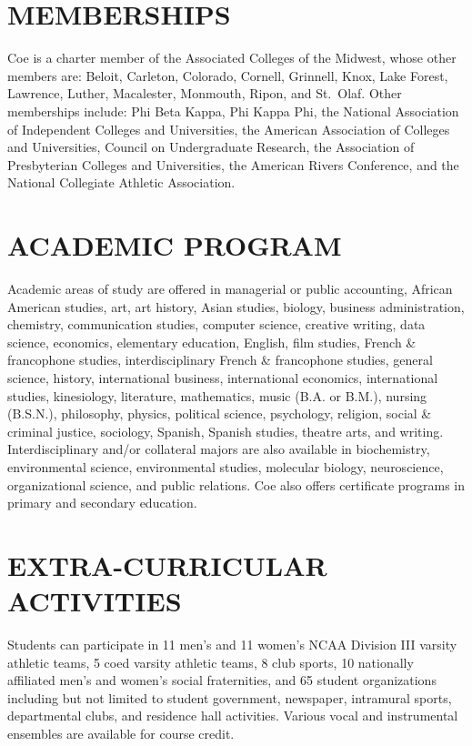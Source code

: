 \documentclass[
  letterpaper,
]{scrbook}
\begin{document}
\section{MEMBERSHIPS}\label{memberships}

Coe is a charter member of the Associated Colleges of the Midwest, whose
other members are: Beloit, Carleton, Colorado, Cornell, Grinnell, Knox,
Lake Forest, Lawrence, Luther, Macalester, Monmouth, Ripon, and
St.~Olaf. Other memberships include: Phi Beta Kappa, Phi Kappa Phi, the
National Association of Independent Colleges and Universities, the
American Association of Colleges and Universities, Council on
Undergraduate Research, the Association of Presbyterian Colleges and
Universities, the American Rivers Conference, and the National
Collegiate Athletic Association.

\section{ACADEMIC PROGRAM}\label{academic-program}

Academic areas of study are offered in managerial or public accounting,
African American studies, art, art history, Asian studies, biology,
business administration, chemistry, communication studies, computer
science, creative writing, data science, economics, elementary
education, English, film studies, French \& francophone studies,
interdisciplinary French \& francophone studies, general science,
history, international business, international economics, international
studies, kinesiology, literature, mathematics, music (B.A. or B.M.),
nursing (B.S.N.), philosophy, physics, political science, psychology,
religion, social \& criminal justice, sociology, Spanish, Spanish
studies, theatre arts, and writing. Interdisciplinary and/or collateral
majors are also available in biochemistry, environmental science,
environmental studies, molecular biology, neuroscience, organizational
science, and public relations. Coe also offers certificate programs in
primary and secondary education.

\section{EXTRA-CURRICULAR ACTIVITIES}\label{extra-curricular-activities}

Students can participate in 11 men's and 11 women's NCAA Division III
varsity athletic teams, 5 coed varsity athletic teams, 8 club sports, 10
nationally affiliated men's and women's social fraternities, and 65
student organizations including but not limited to student government,
newspaper, intramural sports, departmental clubs, and residence hall
activities. Various vocal and instrumental ensembles are available for
course credit.
\end{document}
